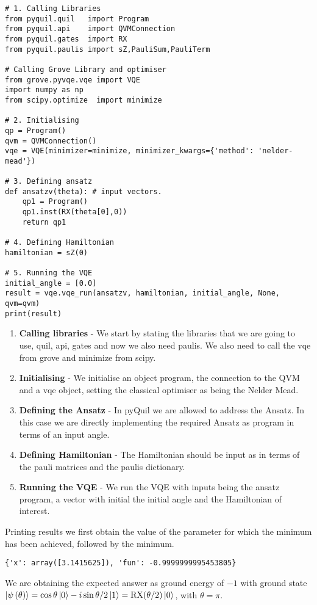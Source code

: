 \begin{verbatim}
# 1. Calling Libraries
from pyquil.quil   import Program
from pyquil.api    import QVMConnection
from pyquil.gates  import RX
from pyquil.paulis import sZ,PauliSum,PauliTerm

# Calling Grove Library and optimiser
from grove.pyvqe.vqe import VQE 
import numpy as np
from scipy.optimize  import minimize

# 2. Initialising
qp = Program()
qvm = QVMConnection()
vqe = VQE(minimizer=minimize, minimizer_kwargs={'method': 'nelder-mead'})

# 3. Defining ansatz
def ansatzv(theta): # input vectors. 
    qp1 = Program()
    qp1.inst(RX(theta[0],0))
    return qp1
    
# 4. Defining Hamiltonian
hamiltonian = sZ(0) 

# 5. Running the VQE
initial_angle = [0.0]
result = vqe.vqe_run(ansatzv, hamiltonian, initial_angle, None, qvm=qvm) 
print(result)
\end{verbatim}

\begin{enumerate}
    \item \textbf{Calling libraries} - We start by stating the libraries that we are going to use, quil, api, gates and now we also need paulis. We also need to call the vqe from grove and minimize from scipy.
    \item \textbf{Initialising} - We initialise an object program, the connection to the QVM and a vqe object, setting the classical optimiser as being the Nelder Mead.
    \item \textbf{Defining the Ansatz} - In pyQuil we are allowed to address the Ansatz. In this case we are directly implementing the required Ansatz as program in terms of an input angle.
    \item \textbf{Defining Hamiltonian} - The Hamiltonian should be input as in terms of the pauli matrices and the paulis dictionary.
    \item \textbf{Running the VQE} - We run the VQE with inputs being the ansatz program, a vector with initial the initial angle and the Hamiltonian of interest.
\end{enumerate}

Printing results we first obtain the value of the parameter for which the minimum has been achieved, followed by the minimum.
\begin{verbatim}
{'x': array([3.1415625]), 'fun': -0.9999999995453805}
\end{verbatim}
We are obtaining the expected answer as ground energy of $-1$ with ground state $\left\vert{\psi\left(\theta\right)}\right\rangle=\cos{\theta}\left\vert{0}\right\rangle-i\sin{\theta/2}\left\vert{1}\right\rangle={\rm RX}(\theta/2)\left\vert{0}\right\rangle$, with $\theta=\pi$.

